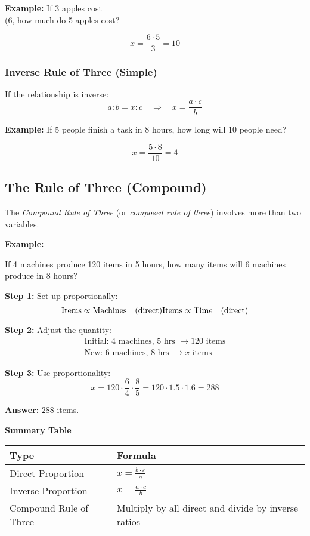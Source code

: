 \textbf{Example:} If 3 apples cost \\(6, how much do 5 apples cost?

\[
x = \frac{6 \cdot 5}{3} = 10
\]

\subsubsection*{Inverse Rule of Three (Simple)}

If the relationship is inverse:
\[
a : b = x : c \quad \Rightarrow \quad x = \frac{a \cdot c}{b}
\]

\textbf{Example:} If 5 people finish a task in 8 hours, how long will 10 people need?

\[
x = \frac{5 \cdot 8}{10} = 4
\]

\subsection{The Rule of Three (Compound)}

The \emph{Compound Rule of Three} (or \emph{composed rule of three}) involves more than two variables.

\textbf{Example:} 

If 4 machines produce 120 items in 5 hours, how many items will 6 machines produce in 8 hours?

\textbf{Step 1:} Set up proportionally:
\[
\text{Items} \propto \text{Machines} \quad (\text{direct}) \\
\text{Items} \propto \text{Time} \quad (\text{direct})
\]

\textbf{Step 2:} Adjust the quantity:
\begin{align*}
\text{Initial: } 4 \text{ machines, } 5 \text{ hrs } \rightarrow 120 \text{ items} \\
\text{New: } 6 \text{ machines, } 8 \text{ hrs } \rightarrow x \text{ items}
\end{align*}

\textbf{Step 3:} Use proportionality:
\[
x = 120 \cdot \frac{6}{4} \cdot \frac{8}{5} = 120 \cdot 1.5 \cdot 1.6 = 288
\]

\textbf{Answer:} 288 items.

\textbf{Summary Table}

\begin{center}
\begin{tabular}{|l|l|}
\hline
\textbf{Type} & \textbf{Formula} \\
\hline
Direct Proportion & \(x = \frac{b \cdot c}{a}\) \\
Inverse Proportion & \(x = \frac{a \cdot c}{b}\) \\
Compound Rule of Three & Multiply by all direct and divide by inverse ratios \\
\hline
\end{tabular}
\end{center}

\newpage
